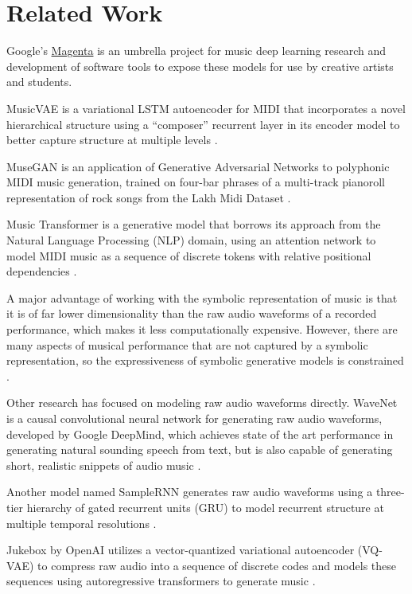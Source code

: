 \documentclass[sigconf,authorversion]{acmart}
\begin{document}
\section{Related Work}

Google's \href{https://magenta.tensorflow.org/}{Magenta} is an umbrella project
for music deep learning research and development of software tools to expose
these models for use by creative artists and students.

MusicVAE is a variational LSTM autoencoder for MIDI that incorporates a
novel hierarchical structure using a ``composer'' recurrent layer in its encoder
model to better capture structure at multiple
levels \cite{roberts_hierarchical_2018}.

MuseGAN \cite{dong2017musegan} is an application of Generative Adversarial
Networks to polyphonic MIDI music generation, trained on four-bar phrases of a
multi-track pianoroll representation of rock songs from the Lakh Midi Dataset
\cite{raffel_learning-based_2016}.

Music Transformer is a generative model that borrows its approach from the
Natural Language Processing (NLP) domain, using an attention network to model
MIDI music as a sequence of discrete tokens with relative positional dependencies
\cite{huang_music_2018}.

A major advantage of working with the symbolic representation of music is that
it is of far lower dimensionality than the raw audio waveforms of a recorded
performance, which makes it less computationally expensive. However, there are
many aspects of musical performance that are not captured by a symbolic
representation, so the expressiveness of symbolic generative models is
constrained \cite{manzelli_conditioning_2018}.

Other research has focused on modeling raw audio waveforms directly. WaveNet is
a causal convolutional neural network for generating raw audio waveforms,
developed by Google DeepMind, which achieves state of the art performance in
generating natural sounding speech from text, but is also capable of generating
short, realistic snippets of audio music \cite{oord_wavenet_2016}.

Another model named SampleRNN generates raw audio waveforms using a three-tier
hierarchy of gated recurrent units (GRU) to model recurrent structure at
multiple temporal resolutions \cite{mehri_samplernn_2017}.

Jukebox by OpenAI utilizes a vector-quantized variational autoencoder (VQ-VAE)
to compress raw audio into a sequence of discrete codes and models these
sequences using autoregressive transformers to generate music
\cite{dhariwal2020jukebox}.
\end{document}
